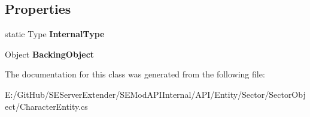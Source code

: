 \subsection*{Properties}
\begin{DoxyCompactItemize}
\item 
\hypertarget{class_s_e_mod_a_p_i_internal_1_1_a_p_i_1_1_entity_1_1_sector_1_1_sector_object_1_1_character_entity_network_manager_a17ae6d6c0943487ee14830e8cf357f30}{}static Type {\bfseries Internal\+Type}\label{class_s_e_mod_a_p_i_internal_1_1_a_p_i_1_1_entity_1_1_sector_1_1_sector_object_1_1_character_entity_network_manager_a17ae6d6c0943487ee14830e8cf357f30}

\item 
\hypertarget{class_s_e_mod_a_p_i_internal_1_1_a_p_i_1_1_entity_1_1_sector_1_1_sector_object_1_1_character_entity_network_manager_adb4837fbd0239013b95fa32f0478640b}{}Object {\bfseries Backing\+Object}\label{class_s_e_mod_a_p_i_internal_1_1_a_p_i_1_1_entity_1_1_sector_1_1_sector_object_1_1_character_entity_network_manager_adb4837fbd0239013b95fa32f0478640b}

\end{DoxyCompactItemize}


The documentation for this class was generated from the following file\+:\begin{DoxyCompactItemize}
\item 
E\+:/\+Git\+Hub/\+S\+E\+Server\+Extender/\+S\+E\+Mod\+A\+P\+I\+Internal/\+A\+P\+I/\+Entity/\+Sector/\+Sector\+Object/Character\+Entity.\+cs\end{DoxyCompactItemize}

